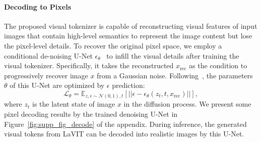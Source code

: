 \paragraph{Decoding to Pixels} The proposed visual tokenizer is capable of reconstructing visual features of input images that contain high-level semantics to represent the image content but lose the pixel-level details. To recover the original pixel space, we employ a conditional de-noising U-Net $\epsilon_\theta$~\citep{rombach2022high} to infill the visual details after training the visual tokenizer. Specifically, it takes the reconstructed $x_{\text{rec}}$ as the condition to progressively recover image $x$ from a Gaussian noise. Following~\citet{rombach2022high}, the parameters $\theta$ of this U-Net are optimized by $\epsilon$ prediction:
\begin{equation}
    \mathcal{L}_{\theta} = \mathbb{E}_{z, \epsilon \sim \mathcal{N}(0,1), t} \left[ ||\epsilon - \epsilon_{\theta}(z_t, t, x_{\text{rec}}) || \right],
\end{equation}
where $z_t$ is the latent state of image $x$ in the diffusion process. We present some pixel decoding results by the trained denoising U-Net in Figure~\ref{fig:supp_fig_decode} of the appendix. During inference, the generated visual tokens from LaVIT can be decoded into realistic images by this U-Net.

